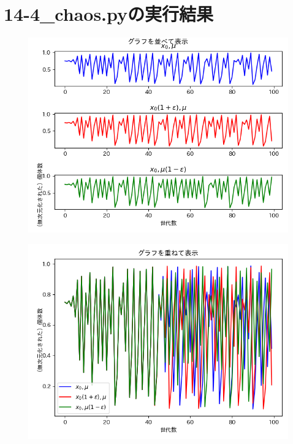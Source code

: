 \documentclass[a4paper, oneside]{jsarticle}
\begin{document}
\section{14-4\_chaos.pyの実行結果}

\begin{figure}[h]
  \includegraphics[width=150mm]{chaos-parallel.png}
    \label{fig:chaos-parallel}
\end{figure}
\begin{figure}[h]
  \includegraphics[width=150mm]{chaos-overlap.png}
    \label{fig:chaos-overlap}
\end{figure}
\end{document}
